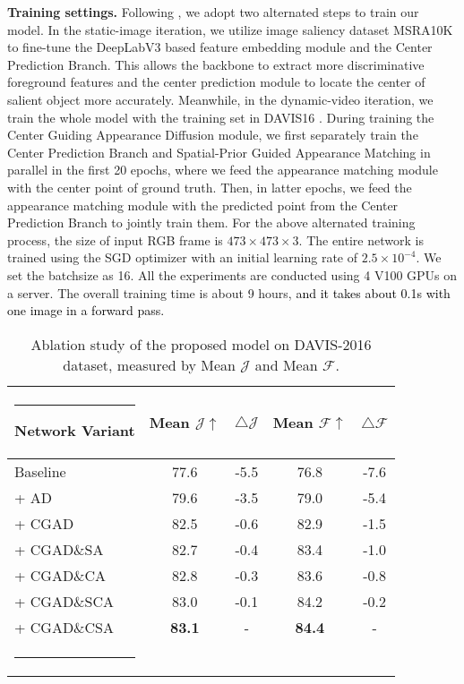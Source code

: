 \documentclass[letterpaper]{article} \usepackage{aaai20}  \usepackage{times}  \usepackage{helvet} \usepackage{courier}  \usepackage[hyphens]{url}  \usepackage{graphicx} \urlstyle{rm} \def\UrlFont{\rm}  \usepackage{graphicx}  \frenchspacing  \setlength{\pdfpagewidth}{8.5in}  \setlength{\pdfpageheight}{11in}  \usepackage{amssymb}
\makeatletter
\def\hlinew#1{\noalign{\ifnum0=`}\fi\hrule \@height #1 \futurelet
   \reserved@a\@xhline}
\newcommand{\ldz}[1]{\textcolor{black}{#1}}
\makeatother
\begin{document}
\noindent \textbf{Training settings.} Following \cite{wang2019zero,lu2019see}, we adopt two alternated steps to train our model. In the static-image iteration, we utilize image saliency dataset MSRA10K \cite{cheng2014global} to fine-tune the DeepLabV3 based feature embedding module and the Center Prediction Branch. This allows the backbone to extract more discriminative foreground features and the center prediction module to locate the center of salient object more accurately. Meanwhile, in the dynamic-video iteration, we train the whole model with the training set in DAVIS16 \cite{perazzi2016benchmark}. During training the Center Guiding Appearance Diffusion module, we first separately train the Center Prediction Branch and Spatial-Prior Guided Appearance Matching in parallel in the first 20 epochs, where we feed the appearance matching module with the center point of ground truth. Then, in latter epochs, we feed the appearance matching module with the predicted point from the Center Prediction Branch to jointly train them.
For the above alternated training process, the size of input RGB frame is $473 \times 473 \times 3$. The entire network is trained using the SGD optimizer with an initial learning rate of $2.5 \times10^{-4}$. We set the batchsize as 16. All the experiments are conducted using 4 V100 GPUs on a server. The overall training time is about 9 hours, \ldz{and it takes about 0.1s with one image in a forward pass.}



\begin{table}[t!]
    \centering
    \caption{Ablation study of the proposed model on DAVIS-2016 dataset, measured by Mean $\mathcal{J}$ and Mean $\mathcal{F}$.}
    \begin{tabular}{l||cc|cc}
    \hlinew{1pt}
    Network Variant & Mean $\mathcal{J} \uparrow$ & $\bigtriangleup \mathcal{J}$ & Mean $\mathcal{F} \uparrow$ & $\bigtriangleup \mathcal{F}$ \\ \hline \hline
    Baseline & 77.6 & -5.5 & 76.8 & -7.6 \\ \hline
    + AD & 79.6 & -3.5 & 79.0 & -5.4 \\
    + CGAD & 82.5 & -0.6 & 82.9 & -1.5 \\ \hline
+ CGAD\&SA & 82.7 & -0.4 & 83.4 & -1.0 \\
    + CGAD\&CA & 82.8 & -0.3 & 83.6 & -0.8 \\
    + CGAD\&SCA & 83.0 & -0.1 & 84.2 & -0.2 \\
    + CGAD\&CSA & \textbf{83.1} & - & \textbf{84.4} & - \\ \hlinew{1pt}
    \end{tabular}
    \label{tab:ablation1}
    \vspace{-12pt}
\end{table}
\end{document}
